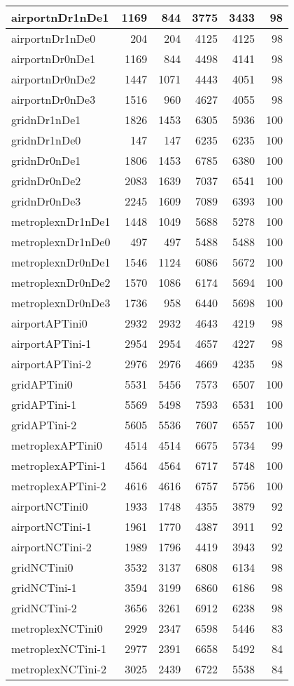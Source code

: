 \begin{longtable}{|l|r|r|r|r|r|}
\endlastfoot
airportnDr1nDe1 & 1169 & 844 & 3775 & 3433 & 98 \\ \hline
airportnDr1nDe0 & 204 & 204 & 4125 & 4125 & 98 \\ \hline
airportnDr0nDe1 & 1169 & 844 & 4498 & 4141 & 98 \\ \hline
airportnDr0nDe2 & 1447 & 1071 & 4443 & 4051 & 98 \\ \hline
airportnDr0nDe3 & 1516 & 960 & 4627 & 4055 & 98 \\ \hline
gridnDr1nDe1 & 1826 & 1453 & 6305 & 5936 & 100 \\ \hline
gridnDr1nDe0 & 147 & 147 & 6235 & 6235 & 100 \\ \hline
gridnDr0nDe1 & 1806 & 1453 & 6785 & 6380 & 100 \\ \hline
gridnDr0nDe2 & 2083 & 1639 & 7037 & 6541 & 100 \\ \hline
gridnDr0nDe3 & 2245 & 1609 & 7089 & 6393 & 100 \\ \hline
metroplexnDr1nDe1 & 1448 & 1049 & 5688 & 5278 & 100 \\ \hline
metroplexnDr1nDe0 & 497 & 497 & 5488 & 5488 & 100 \\ \hline
metroplexnDr0nDe1 & 1546 & 1124 & 6086 & 5672 & 100 \\ \hline
metroplexnDr0nDe2 & 1570 & 1086 & 6174 & 5694 & 100 \\ \hline
metroplexnDr0nDe3 & 1736 & 958 & 6440 & 5698 & 100 \\ \hline
airportAPTini0 & 2932 & 2932 & 4643 & 4219 & 98 \\ \hline
airportAPTini-1 & 2954 & 2954 & 4657 & 4227 & 98 \\ \hline
airportAPTini-2 & 2976 & 2976 & 4669 & 4235 & 98 \\ \hline
gridAPTini0 & 5531 & 5456 & 7573 & 6507 & 100 \\ \hline
gridAPTini-1 & 5569 & 5498 & 7593 & 6531 & 100 \\ \hline
gridAPTini-2 & 5605 & 5536 & 7607 & 6557 & 100 \\ \hline
metroplexAPTini0 & 4514 & 4514 & 6675 & 5734 & 99 \\ \hline
metroplexAPTini-1 & 4564 & 4564 & 6717 & 5748 & 100 \\ \hline
metroplexAPTini-2 & 4616 & 4616 & 6757 & 5756 & 100 \\ \hline
airportNCTini0 & 1933 & 1748 & 4355 & 3879 & 92 \\ \hline
airportNCTini-1 & 1961 & 1770 & 4387 & 3911 & 92 \\ \hline
airportNCTini-2 & 1989 & 1796 & 4419 & 3943 & 92 \\ \hline
gridNCTini0 & 3532 & 3137 & 6808 & 6134 & 98 \\ \hline
gridNCTini-1 & 3594 & 3199 & 6860 & 6186 & 98 \\ \hline
gridNCTini-2 & 3656 & 3261 & 6912 & 6238 & 98 \\ \hline
metroplexNCTini0 & 2929 & 2347 & 6598 & 5446 & 83 \\ \hline
metroplexNCTini-1 & 2977 & 2391 & 6658 & 5492 & 84 \\ \hline
metroplexNCTini-2 & 3025 & 2439 & 6722 & 5538 & 84 \\ \hline
\end{longtable}
\fi
